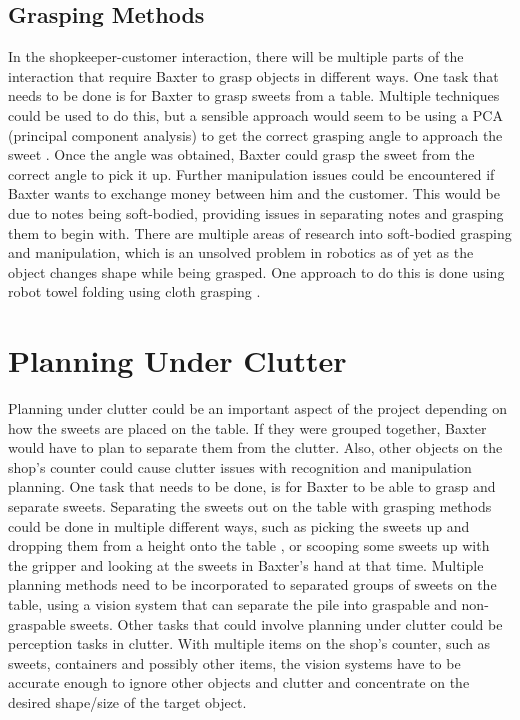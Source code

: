 \subsection{Grasping Methods}
In the shopkeeper-customer interaction, there will be multiple parts of the interaction that require Baxter to grasp objects in different ways. One task that needs to be done is for Baxter to grasp sweets from a table. Multiple techniques could be used to do this, but a sensible approach would seem to be using a PCA (principal component analysis) to get the correct grasping angle to approach the sweet \cite{PCA}. Once the angle was obtained, Baxter could grasp the sweet from the correct angle to pick it up.
\newline\newline
Further manipulation issues could be encountered if Baxter wants to exchange money between him and the customer. This would be due to notes being soft-bodied, providing issues in separating notes and grasping them to begin with. There are multiple areas of research into soft-bodied grasping and manipulation, which is an unsolved problem in robotics as of yet as the object changes shape while being grasped. One approach to do this is done using robot towel folding using cloth grasping \cite{clothgrasp}.
\section{Planning Under Clutter}
Planning under clutter could be an important aspect of the project depending on how the sweets are placed on the table. If they were grouped together, Baxter would have to plan to separate them from the clutter. Also, other objects on the shop's counter could cause clutter issues with recognition and manipulation planning.
\newline\newline
One task that needs to be done, is for Baxter to be able to grasp and separate sweets. Separating the sweets out on the table with grasping methods could be done in multiple different ways, such as picking the sweets up and dropping them from a height onto the table \cite{clutter}, or scooping some sweets up with the gripper and looking at the sweets in Baxter's hand at that time. Multiple planning methods need to be incorporated to separated groups of sweets on the table, using a vision system that can separate the pile into graspable and non-graspable sweets.
\newline\newline
Other tasks that could involve planning under clutter could be perception tasks in clutter. With multiple items on the shop's counter, such as sweets, containers and possibly other items, the vision systems have to be accurate enough to ignore other objects and clutter and concentrate on the desired shape/size of the target object.
